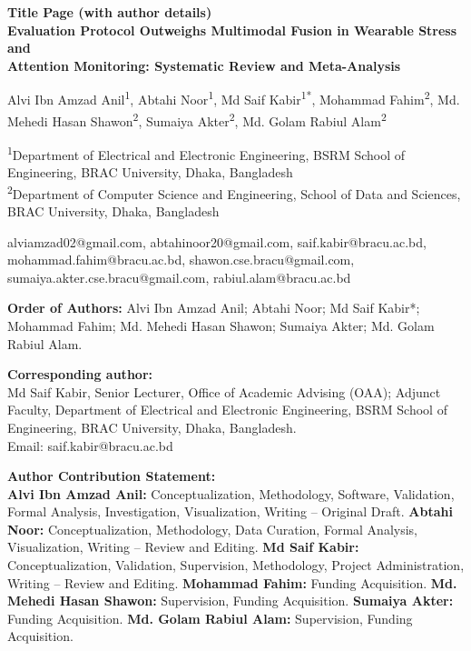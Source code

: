\thispagestyle{empty}
\begin{center}
{\bfseries\large Title Page (with author details)}\\[14pt]
{\large\bfseries Evaluation Protocol Outweighs Multimodal Fusion in Wearable Stress and\\[2pt]
Attention Monitoring: Systematic Review and Meta-Analysis}\\[14pt]
\end{center}

Alvi Ibn Amzad Anil\textsuperscript{1}, Abtahi Noor\textsuperscript{1},
Md Saif Kabir\textsuperscript{1*}, Mohammad Fahim\textsuperscript{2},
Md. Mehedi Hasan Shawon\textsuperscript{2}, Sumaiya Akter\textsuperscript{2},
Md. Golam Rabiul Alam\textsuperscript{2}

\vspace{6pt}
\textsuperscript{1}Department of Electrical and Electronic Engineering, BSRM School of
Engineering, BRAC University, Dhaka, Bangladesh\\
\textsuperscript{2}Department of Computer Science and Engineering, School of Data and
Sciences, BRAC University, Dhaka, Bangladesh

\vspace{6pt}
alviamzad02@gmail.com, abtahinoor20@gmail.com, saif.kabir@bracu.ac.bd,
mohammad.fahim@bracu.ac.bd, shawon.cse.bracu@gmail.com,
sumaiya.akter.cse.bracu@gmail.com, rabiul.alam@bracu.ac.bd

\vspace{10pt}
\textbf{Order of Authors:} Alvi Ibn Amzad Anil; Abtahi Noor; Md Saif Kabir*;
Mohammad Fahim; Md. Mehedi Hasan Shawon; Sumaiya Akter; Md. Golam Rabiul Alam.

\vspace{10pt}
\textbf{Corresponding author:}\\
Md Saif Kabir, Senior Lecturer, Office of Academic Advising (OAA);
Adjunct Faculty, Department of Electrical and Electronic Engineering,
BSRM School of Engineering, BRAC University, Dhaka, Bangladesh.\\
Email: saif.kabir@bracu.ac.bd

\vspace{10pt}
\textbf{Author Contribution Statement:}\\
\textbf{Alvi Ibn Amzad Anil:} Conceptualization, Methodology, Software, Validation, Formal
Analysis, Investigation, Visualization, Writing -- Original Draft.
\textbf{Abtahi Noor:} Conceptualization, Methodology, Data Curation, Formal Analysis,
Visualization, Writing -- Review and Editing.
\textbf{Md Saif Kabir:} Conceptualization, Validation, Supervision, Methodology, Project
Administration, Writing -- Review and Editing.
\textbf{Mohammad Fahim:} Funding Acquisition.
\textbf{Md. Mehedi Hasan Shawon:} Supervision, Funding Acquisition.
\textbf{Sumaiya Akter:} Funding Acquisition.
\textbf{Md. Golam Rabiul Alam:} Supervision, Funding Acquisition.

\newpage
